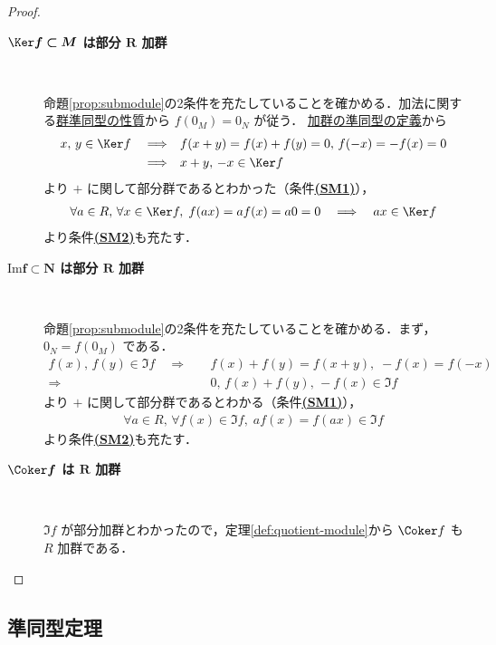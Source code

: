 \documentclass[geometry_main]{subfiles}
\begin{document}
\begin{proof}
	\begin{description}
        \item[\textbf{$\bm{\Ker f \subset M}$ は部分 $\bm{R}$ 加群}]　
        
		命題\ref{prop:submodule}の2条件を充たしていることを確かめる．加法に関する\hyperref[prop.hom_group-1]{群準同型の性質}から $f(0_M) = 0_N$ が従う．
		\hyperref[def:homo-module]{加群の準同型の定義}から
		\begin{align}
            x,\, y \in \Ker f \quad \Longrightarrow \quad &f(x + y) = f(x) + f(y) = 0,\, f(-x) = -f(x) = 0 \\
            \Longrightarrow \quad &x+y,\, -x \in \Ker f
        \end{align}
        より $+$ に関して部分群であるとわかった（条件\hyperref[prop:submodule]{\textbf{(SM1)}}），
        \begin{align}
            \forall a \in R,\, \forall x \in \Ker f,\; f(ax) = af(x) = a0 = 0 \quad \Longrightarrow \quad ax \in \Ker f
        \end{align}
        より条件\hyperref[prop:submodule]{\textbf{(SM2)}}も充たす．
        \item[\textbf{$\bm{\mathrm{Im} f \subset N}$ は部分 $\bm{R}$ 加群}]　
        
		命題\ref{prop:submodule}の2条件を充たしていることを確かめる．まず，$0_N = f(0_M)$ である．
        \begin{align}
            f(x),\, f(y) \in \Im f \quad \Longrightarrow \quad &f(x) + f(y) = f(x+y),\; -f(x) = f(-x) \\
            \Longrightarrow \quad &0,\,  f(x) + f(y),\, -f(x) \in \Im f
        \end{align}
        より $+$ に関して部分群であるとわかる（条件\hyperref[prop:submodule]{\textbf{(SM1)}}），
        \begin{align}
            \forall a \in R,\, \forall f(x) \in \Im f,\; a f(x) = f(ax) \in \Im f
        \end{align}
        より条件\hyperref[prop:submodule]{\textbf{(SM2)}}も充たす．
        \item[\textbf{$\bm{\Coker f}$ は $\bm{R}$ 加群}]　
		
		$\Im f$ が部分加群とわかったので，定理\ref{def:quotient-module}から $\Coker f$ も $R$ 加群である．
    \end{description}
\end{proof}

\subsection{準同型定理}
\end{document}
